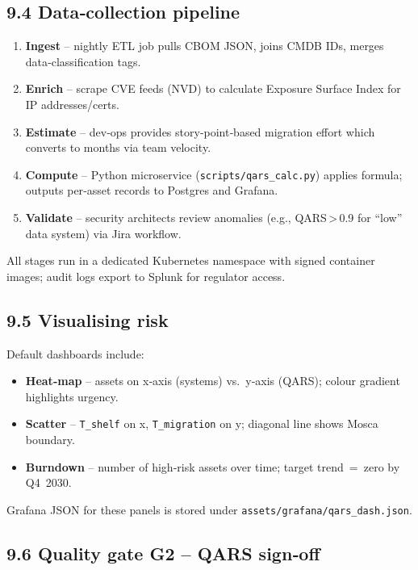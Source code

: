 \documentclass[
  english,
]{article}
\providecommand{\tightlist}{%
  \setlength{\itemsep}{0pt}\setlength{\parskip}{0pt}}
\begin{document}
\subsection{9.4 Data‑collection pipeline}\label{datacollection-pipeline}

\begin{enumerate}
\def\labelenumi{\arabic{enumi}.}
\tightlist
\item
  \textbf{Ingest} -- nightly ETL job pulls CBOM JSON, joins CMDB IDs,
  merges data‑classification tags.
\item
  \textbf{Enrich} -- scrape CVE feeds (NVD) to calculate Exposure
  Surface Index for IP addresses/certs.
\item
  \textbf{Estimate} -- dev‑ops provides story‑point‑based migration
  effort which converts to months via team velocity.
\item
  \textbf{Compute} -- Python microservice
  (\texttt{scripts/qars\_calc.py}) applies formula; outputs per‑asset
  records to Postgres and Grafana.
\item
  \textbf{Validate} -- security architects review anomalies (e.g.,
  QARS\,\textgreater\,0.9 for ``low'' data system) via Jira workflow.
\end{enumerate}

All stages run in a dedicated Kubernetes namespace with signed container
images; audit logs export to Splunk for regulator access.

\subsection{9.5 Visualising risk}\label{visualising-risk}

Default dashboards include:

\begin{itemize}
\tightlist
\item
  \textbf{Heat‑map} -- assets on x‑axis (systems) vs.~y‑axis (QARS);
  colour gradient highlights urgency.
\item
  \textbf{Scatter} -- \texttt{T\_shelf} on x, \texttt{T\_migration} on
  y; diagonal line shows Mosca boundary.
\item
  \textbf{Burndown} -- number of high‑risk assets over time; target
  trend~=~zero by Q4~2030.
\end{itemize}

Grafana JSON for these panels is stored under
\texttt{assets/grafana/qars\_dash.json}.

\subsection{9.6 Quality gate G2 -- QARS
sign‑off}\label{quality-gate-g2-qars-signoff}
\end{document}
